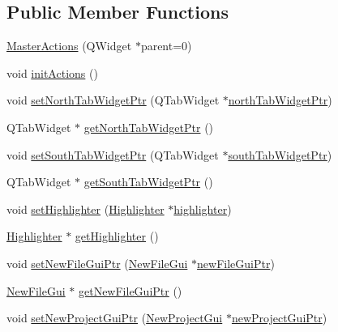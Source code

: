 \subsection*{Public Member Functions}
\begin{DoxyCompactItemize}
\item 
\hyperlink{class_master_actions_ad8eb348b90e75f5876c30692930a2c22}{Master\-Actions} (Q\-Widget $\ast$parent=0)
\item 
void \hyperlink{class_master_actions_a9e2ff3903452d1212d530e20af9d7936}{init\-Actions} ()
\item 
void \hyperlink{class_master_actions_ab831fe700bf1327e6cde36f9272ecc11}{set\-North\-Tab\-Widget\-Ptr} (Q\-Tab\-Widget $\ast$\hyperlink{class_master_actions_a4fbb50c5700fd6b66ace4cff6d3bde3e}{north\-Tab\-Widget\-Ptr})
\item 
Q\-Tab\-Widget $\ast$ \hyperlink{class_master_actions_ac58b3c22042de182e6185e1700fa2f5e}{get\-North\-Tab\-Widget\-Ptr} ()
\item 
void \hyperlink{class_master_actions_a78be0913c3adbd5c6ec96b60688b0f6f}{set\-South\-Tab\-Widget\-Ptr} (Q\-Tab\-Widget $\ast$\hyperlink{class_master_actions_ae50dea40859da966d8b8a27d2069f6d7}{south\-Tab\-Widget\-Ptr})
\item 
Q\-Tab\-Widget $\ast$ \hyperlink{class_master_actions_ace3070f2fdce3f9bca417e0c05f790fa}{get\-South\-Tab\-Widget\-Ptr} ()
\item 
void \hyperlink{class_master_actions_ae5856ce1f1a1d1f83622631512638dd8}{set\-Highlighter} (\hyperlink{class_highlighter}{Highlighter} $\ast$\hyperlink{class_master_actions_a50b1565db8b7780ec4e88e59953aa67b}{highlighter})
\item 
\hyperlink{class_highlighter}{Highlighter} $\ast$ \hyperlink{class_master_actions_a2b609608d4fdfe1f4abc4ba386e58923}{get\-Highlighter} ()
\item 
void \hyperlink{class_master_actions_a4fde279b855381679703cac9037deb08}{set\-New\-File\-Gui\-Ptr} (\hyperlink{class_new_file_gui}{New\-File\-Gui} $\ast$\hyperlink{class_master_actions_a8839c174acf071c0d9bfe450160218eb}{new\-File\-Gui\-Ptr})
\item 
\hyperlink{class_new_file_gui}{New\-File\-Gui} $\ast$ \hyperlink{class_master_actions_acb2a5079f7000c89fd0817db3ba46040}{get\-New\-File\-Gui\-Ptr} ()
\item 
void \hyperlink{class_master_actions_a4d26f5e2d62c71b71c4a198326b241f1}{set\-New\-Project\-Gui\-Ptr} (\hyperlink{class_new_project_gui}{New\-Project\-Gui} $\ast$\hyperlink{class_master_actions_a78733336a3d5fd3bbb55eaf0215f0d40}{new\-Project\-Gui\-Ptr})

\end{DoxyCompactItemize}

